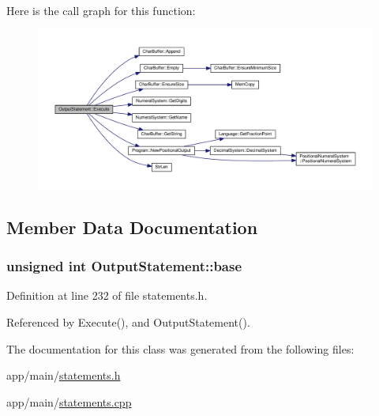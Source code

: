 Here is the call graph for this function\+:
\nopagebreak
\begin{figure}[H]
\begin{center}
\leavevmode
\includegraphics[width=350pt]{d0/d4e/classOutputStatement_a870c0d2b4bffb94e542d1e5890ec3c20_cgraph}
\end{center}
\end{figure}




\subsection{Member Data Documentation}
\subsubsection[{\texorpdfstring{base}{base}}]{\setlength{\rightskip}{0pt plus 5cm}unsigned int Output\+Statement\+::base\hspace{0.3cm}{\ttfamily [private]}}\hypertarget{classOutputStatement_ab0731e7d23a5d915e8b2ee12ceb1dbc5}{}\label{classOutputStatement_ab0731e7d23a5d915e8b2ee12ceb1dbc5}


Definition at line 232 of file statements.\+h.



Referenced by Execute(), and Output\+Statement().



The documentation for this class was generated from the following files\+:\begin{DoxyCompactItemize}
\item 
app/main/\hyperlink{statements_8h}{statements.\+h}\item 
app/main/\hyperlink{statements_8cpp}{statements.\+cpp}\end{DoxyCompactItemize}
